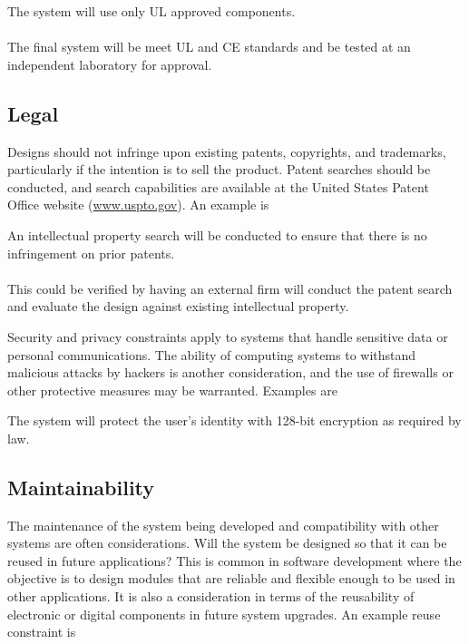 \begin{itquote}
The system will use only UL approved components.\\ \\
The final system will be meet UL and CE standards and be tested at an
independent laboratory for approval.
\end{itquote}

\subsection*{Legal}
\label{subsection:legal}

Designs should not infringe upon existing patents, copyrights, and
trademarks, particularly if the intention is to sell the product. Patent
searches should be conducted, and search capabilities are available at
the United States Patent Office website
(\href{http://www.uspto.gov}{www.uspto.gov}). An example is

\begin{itquote}
An intellectual property search will be conducted to ensure that there
is no infringement on prior patents.\\ \\
This could be verified by having an external firm will conduct the
patent search and evaluate the design against existing intellectual
property.
\end{itquote}

Security and privacy constraints apply to systems that handle sensitive
data or personal communications. The ability of computing systems to
withstand malicious attacks by hackers is another consideration, and the
use of firewalls or other protective measures may be warranted. Examples
are

\begin{itquote}
The system will protect the user's identity with 128-bit encryption as
required by law.
\end{itquote}

\subsection*{Maintainability}
\label{section:maintainability}

The maintenance of the system being developed and compatibility with
other systems are often considerations. Will the system be designed so
that it can be reused in future applications? This is common in software
development where the objective is to design modules that are reliable
and flexible enough to be used in other applications. It is also a
consideration in terms of the reusability of electronic or digital
components in future system upgrades. An example reuse constraint is

